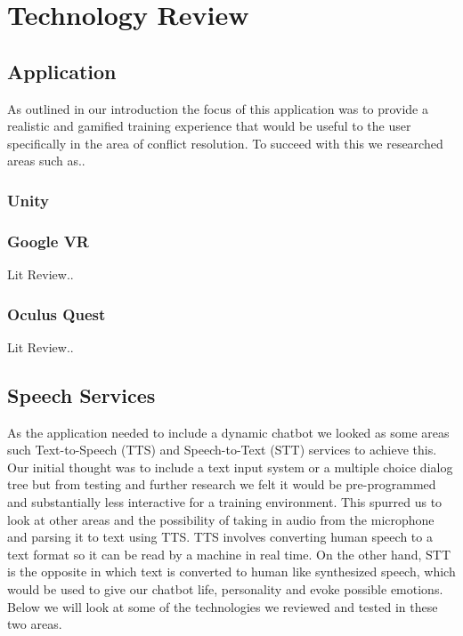 \chapter{Technology Review}

\section{Application}
As outlined in our introduction the focus of this application was to provide a realistic and gamified training experience that would be useful to the user specifically in the area of conflict resolution. To succeed with this we researched areas such as..

\subsection{Unity}

\subsection{Google VR}
Lit Review..
\subsection{Oculus Quest}
Lit Review..

\section{Speech Services}
As the application needed to include a dynamic chatbot we looked as some areas such Text-to-Speech (TTS) and Speech-to-Text (STT) services to achieve this. Our initial thought was to include a text input system or a multiple choice dialog tree but from testing and further research we felt it would be pre-programmed and substantially less interactive for a training environment. This spurred us to look at other areas and the possibility of taking in audio from the microphone and parsing it to text using TTS. TTS involves converting human speech to a text format so it can be read by a machine in real time. On the other hand, STT is the opposite in which text is converted to human like synthesized speech, which would be used to give our chatbot life, personality and evoke possible emotions. Below we will look at some of the technologies we reviewed and tested in these two areas.

